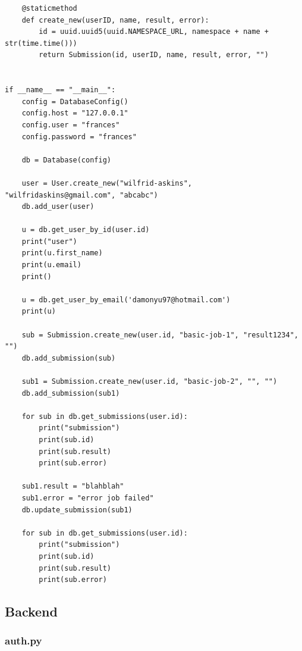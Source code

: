 \documentclass[12pt, letterpaper]{article}
\begin{document}
\begin{verbatim}
    @staticmethod
    def create_new(userID, name, result, error):
        id = uuid.uuid5(uuid.NAMESPACE_URL, namespace + name + str(time.time()))
        return Submission(id, userID, name, result, error, "")


if __name__ == "__main__":
    config = DatabaseConfig()
    config.host = "127.0.0.1"
    config.user = "frances"
    config.password = "frances"

    db = Database(config)

    user = User.create_new("wilfrid-askins", "wilfridaskins@gmail.com", "abcabc")
    db.add_user(user)

    u = db.get_user_by_id(user.id)
    print("user")
    print(u.first_name)
    print(u.email)
    print()

    u = db.get_user_by_email('damonyu97@hotmail.com')
    print(u)

    sub = Submission.create_new(user.id, "basic-job-1", "result1234", "")
    db.add_submission(sub)

    sub1 = Submission.create_new(user.id, "basic-job-2", "", "")
    db.add_submission(sub1)

    for sub in db.get_submissions(user.id):
        print("submission")
        print(sub.id)
        print(sub.result)
        print(sub.error)

    sub1.result = "blahblah"
    sub1.error = "error job failed"
    db.update_submission(sub1)

    for sub in db.get_submissions(user.id):
        print("submission")
        print(sub.id)
        print(sub.result)
        print(sub.error)
\end{verbatim}

\subsection{Backend}
\subsubsection{auth.py}\label{appendix:auth.py}
\end{document}
